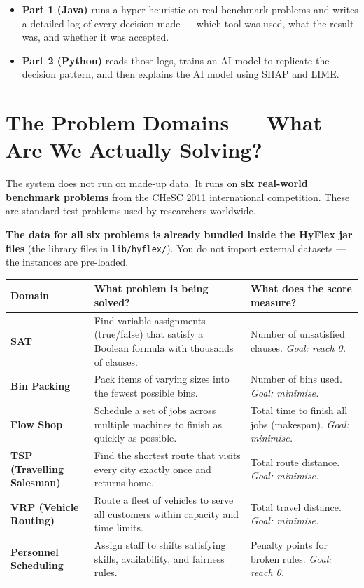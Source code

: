 \documentclass[12pt, a4paper]{article}
\begin{document}
\begin{itemize}
  \item \textbf{Part 1 (Java)} runs a hyper-heuristic on real benchmark problems
        and writes a detailed log of every decision made --- which tool was used,
        what the result was, and whether it was accepted.
  \item \textbf{Part 2 (Python)} reads those logs, trains an AI model to replicate
        the decision pattern, and then explains the AI model using SHAP and LIME.
\end{itemize}

\section{The Problem Domains --- What Are We Actually Solving?}

The system does not run on made-up data. It runs on \textbf{six real-world
benchmark problems} from the CHeSC 2011 international competition. These are
standard test problems used by researchers worldwide.

\textbf{The data for all six problems is already bundled inside the
HyFlex jar files} (the library files in \texttt{lib/hyflex/}). You do
not import external datasets --- the instances are pre-loaded.

\vspace{0.4cm}
\begin{center}
\begin{tabularx}{\linewidth}{>{\bfseries}p{3.8cm} X p{4.5cm}}
\toprule
\textbf{Domain} & \textbf{What problem is being solved?} & \textbf{What does the score measure?} \\
\midrule
SAT
  & Find variable assignments (true/false) that satisfy a Boolean formula with thousands of clauses.
  & Number of unsatisfied clauses. \textit{Goal: reach 0.} \\[6pt]
Bin Packing
  & Pack items of varying sizes into the fewest possible bins.
  & Number of bins used. \textit{Goal: minimise.} \\[6pt]
Flow Shop
  & Schedule a set of jobs across multiple machines to finish as quickly as possible.
  & Total time to finish all jobs (makespan). \textit{Goal: minimise.} \\[6pt]
TSP (Travelling Salesman)
  & Find the shortest route that visits every city exactly once and returns home.
  & Total route distance. \textit{Goal: minimise.} \\[6pt]
VRP (Vehicle Routing)
  & Route a fleet of vehicles to serve all customers within capacity and time limits.
  & Total travel distance. \textit{Goal: minimise.} \\[6pt]
Personnel Scheduling
  & Assign staff to shifts satisfying skills, availability, and fairness rules.
  & Penalty points for broken rules. \textit{Goal: reach 0.} \\
\bottomrule
\end{tabularx}
\end{center}
\end{document}
